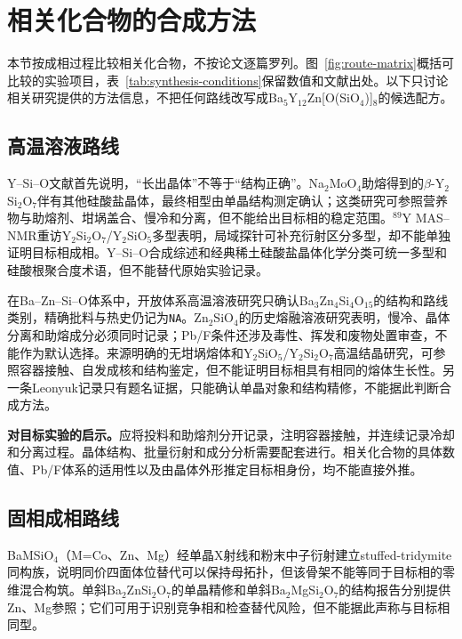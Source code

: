 \section{相关化合物的合成方法}
\label{sec:neighbor-routes}

本节按成相过程比较相关化合物，不按论文逐篇罗列。图~\ref{fig:route-matrix}概括可比较的实验项目，表~\ref{tab:synthesis-conditions}保留数值和文献出处。以下只讨论相关研究提供的方法信息，不把任何路线改写成Ba$_5$Y$_{12}$Zn[O(SiO$_4$)]$_8$的候选配方。

\subsection{高温溶液路线}

Y--Si--O文献首先说明，“长出晶体”不等于“结构正确”。Na$_2$MoO$_4$助熔得到的$\beta$-Y$_2$Si$_2$O$_7$伴有其他硅酸盐晶体，最终相型由单晶结构测定确认；这类研究可参照营养物与助熔剂、坩埚盖合、慢冷和分离，但不能给出目标相的稳定范围\cite{redhammer2003beta}。$^{89}$Y MAS--NMR重访Y$_2$Si$_2$O$_7$/Y$_2$SiO$_5$多型表明，局域探针可补充衍射区分多型，却不能单独证明目标相成相\cite{becerro2004revisiting}。Y--Si--O合成综述和经典稀土硅酸盐晶体化学分类可统一多型和硅酸根聚合度术语，但不能替代原始实验记录\cite{sun2014recent,felsche1973the}。

在Ba--Zn--Si--O体系中，开放体系高温溶液研究只确认Ba$_3$Zn$_4$Si$_4$O$_{15}$的结构和路线类别，精确批料与热史仍记为\texttt{NA}\cite{ababaikeri2024ba3zn4si4o15}。Zn$_2$SiO$_4$的历史熔融溶液研究表明，慢冷、晶体分离和助熔成分必须同时记录；Pb/F条件还涉及毒性、挥发和废物处置审查，不能作为默认选择\cite{giess1982zn2sio4}。来源明确的无坩埚熔体和Y$_2$SiO$_5$/Y$_2$Si$_2$O$_7$高温结晶研究，可参照容器接触、自发成核和结构鉴定，但不能证明目标相具有相同的熔体生长性\cite{christensen1994investigation,leonyuk1999high}。另一条Leonyuk记录只有题名证据，只能确认单晶对象和结构精修，不能据此判断合成方法\cite{leonyuk1999crystal}。

\textbf{对目标实验的启示。}应将投料和助熔剂分开记录，注明容器接触，并连续记录冷却和分离过程。晶体结构、批量衍射和成分分析需要配套进行。相关化合物的具体数值、Pb/F体系的适用性以及由晶体外形推定目标相身份，均不能直接外推。

\subsection{固相成相路线}

BaMSiO$_4$（M=Co、Zn、Mg）经单晶X射线和粉末中子衍射建立stuffed-tridymite同构族，说明同价四面体位替代可以保持母拓扑，但该骨架不能等同于目标相的零维混合构筑\cite{liu1993structures}。单斜Ba$_2$ZnSi$_2$O$_7$的单晶精修和单斜Ba$_2$MgSi$_2$O$_7$的结构报告分别提供Zn、Mg参照；它们可用于识别竞争相和检查替代风险，但不能据此声称与目标相同型\cite{kaiser2002crystal,aitasalo2006crystal}。

